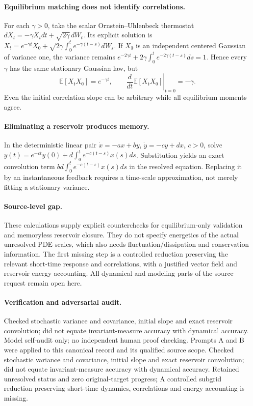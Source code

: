 \documentclass[11pt]{article}
\begin{document}
\paragraph{Equilibrium matching does not identify correlations.} For each $\gamma>0$, take the scalar Ornstein--Uhlenbeck thermostat $dX_t=-\gamma X_tdt+\sqrt{2\gamma}\,dW_t$. Its explicit solution is $X_t=e^{-\gamma t}X_0+\sqrt{2\gamma}\int_0^te^{-\gamma(t-s)}dW_s$. If $X_0$ is an independent centered Gaussian of variance one, the variance remains $e^{-2\gamma t}+2\gamma\int_0^te^{-2\gamma(t-s)}ds=1$. Hence every $\gamma$ has the same stationary Gaussian law, but
\[
 \mathbb E[X_tX_0]=e^{-\gamma t},\qquad
 \left.\frac d{dt}\mathbb E[X_tX_0]\right|_{t=0}=-\gamma.
\]
Even the initial correlation slope can be arbitrary while all equilibrium moments agree.

\paragraph{Eliminating a reservoir produces memory.} In the deterministic linear pair $\dot x=-ax+by$, $\dot y=-cy+dx$, $c>0$, solve $y(t)=e^{-ct}y(0)+d\int_0^te^{-c(t-s)}x(s)ds$. Substitution yields an exact convolution term $bd\int_0^te^{-c(t-s)}x(s)ds$ in the resolved equation. Replacing it by an instantaneous feedback requires a time-scale approximation, not merely fitting a stationary variance.

\paragraph{Source-level gap.} These calculations supply explicit counterchecks for equilibrium-only validation and memoryless reservoir closure. They do not specify energetics of the actual unresolved PDE scales, which also needs fluctuation/dissipation and conservation information. The first missing step is a controlled reduction preserving the relevant short-time response and correlations, with a justified vector field and reservoir energy accounting. All dynamical and modeling parts of the source request remain open here.

\paragraph{Verification and adversarial audit.}
Checked stochastic variance and covariance, initial slope and exact reservoir convolution; did not equate invariant-measure accuracy with dynamical accuracy. Model self-audit only; no independent human proof checking. Prompts A and B were applied to this canonical record and its qualified source scope. Checked stochastic variance and covariance, initial slope and exact reservoir convolution; did not equate invariant-measure accuracy with dynamical accuracy. Retained unresolved status and zero original-target progress; A controlled subgrid reduction preserving short-time dynamics, correlations and energy accounting is missing.
\end{document}
